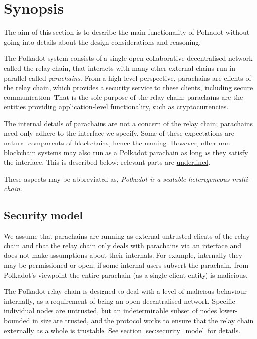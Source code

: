\section{Synopsis}\label{sec:summary}
The aim of this section is to describe the main functionality of Polkadot without going into details about the design considerations and reasoning.

The Polkadot system consists of a single open collaborative decentralised network called the relay chain, that interacts with many other external chains run in parallel called \emph{parachains}. From a high-level perspective, parachains are clients of the relay chain, which provides a security service to these clients, including secure communication. That is the sole purpose of the relay chain; parachains are the entities providing application-level functionality, such as cryptocurrencies.

The internal details of parachains are not a concern of the relay chain; parachains need only adhere to the interface we specify. Some of these expectations are natural components of blockchains, hence the naming. However, other non-blockchain systems may also run as a Polkadot parachain as long as they satisfy the interface. This is described below: relevant parts are \uline{underlined}.

These aspects may be abbreviated as, \emph{Polkadot is a scalable heterogeneous multi-chain}.

\subsection{Security model}

We assume that parachains are running as external untrusted clients of the relay chain and that the relay chain only deals with parachains via an interface and does not make assumptions about their internals. For example, internally they may be permissioned or open; if some internal users subvert the parachain, from Polkadot's viewpoint the entire parachain (as a single client entity) is malicious.

The Polkadot relay chain is designed to deal with a level of malicious behaviour internally, as a requirement of being an open decentralised network. Specific individual nodes are untrusted, but an indeterminable subset of nodes lower-bounded in size are trusted, and the protocol works to ensure that the relay chain externally as a whole is trustable. See section \ref{sec:security_model} for details.


